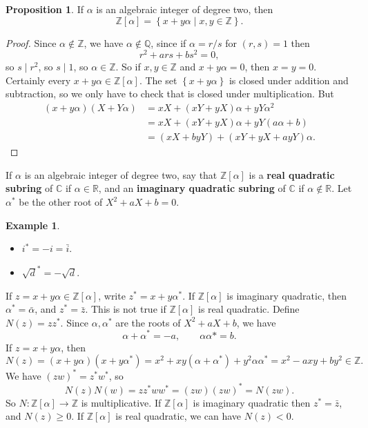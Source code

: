 \documentclass{article}
\newcommand{\Z}{\mathbb{Z}}
\newcommand{\Q}{\mathbb{Q}}
\newcommand{\R}{\mathbb{R}}
\newcommand{\C}{\mathbb{C}}
\newcommand{\rb}[1]{\left( #1 \right)}
\renewcommand{\sb}[1]{\left[ #1 \right]}
\newcommand{\cb}[1]{\left\{ #1 \right\}}
\theoremstyle{definition}\newtheorem{definition}{Definition}
\theoremstyle{definition}\newtheorem{remark}[definition]{Remark}
\theoremstyle{definition}\newtheorem*{example}{Example}
\theoremstyle{definition}\newtheorem*{note}{Note}
\newtheorem{proposition}[definition]{Proposition}
\begin{document}
\begin{proposition}
If $ \alpha $ is an algebraic integer of degree two, then
$$ \Z\sb{\alpha} = \cb{x + y\alpha \mid x, y \in \Z}. $$
\end{proposition}

\begin{proof}
Since $ \alpha \notin \Z $, we have $ \alpha \notin \Q $, since if $ \alpha = r / s $ for $ \rb{r, s} = 1 $ then
$$ r^2 + ars + bs^2 = 0, $$
so $ s \mid r^2 $, so $ s \mid 1 $, so $ \alpha \in \Z $. So if $ x, y \in \Z $ and $ x + y\alpha = 0 $, then $ x = y = 0 $. Certainly every $ x + y\alpha \in \Z\sb{\alpha} $. The set $ \cb{x + y\alpha} $ is closed under addition and subtraction, so we only have to check that is closed under multiplication. But
\begin{align*}
\rb{x + y\alpha}\rb{X + Y\alpha}
& = xX + \rb{xY + yX}\alpha + yY\alpha^2 \\
& = xX + \rb{xY + yX}\alpha + yY\rb{a\alpha + b} \\
& = \rb{xX + byY} + \rb{xY + yX + ayY}\alpha.
\end{align*}
\end{proof}

If $ \alpha $ is an algebraic integer of degree two, say that $ \Z\sb{\alpha} $ is a \textbf{real quadratic subring} of $ \C $ if $ \alpha \in \R $, and an \textbf{imaginary quadratic subring} of $ \C $ if $ \alpha \notin \R $. Let $ \alpha^* $ be the other root of $ X^2 + aX + b = 0 $.

\begin{example}
\hfill
\begin{itemize}
\item $ i^* = -i = \bar{i} $.
\item $ \sqrt{d}^* = -\sqrt{d} $.
\end{itemize}
\end{example}

If $ z = x + y\alpha \in \Z\sb{\alpha} $, write $ z^* = x + y\alpha^* $. If $ \Z\sb{\alpha} $ is imaginary quadratic, then $ \alpha^* = \bar{\alpha} $, and $ z^* = \bar{z} $. This is not true if $ \Z\sb{\alpha} $ is real quadratic. Define $ N\rb{z} = zz^* $. Since $ \alpha, \alpha^* $ are the roots of $ X^2 + aX + b $, we have
$$ \alpha + \alpha^* = -a, \qquad \alpha\alpha* = b. $$
If $ z = x + y\alpha $, then
$$ N\rb{z} = \rb{x + y\alpha}\rb{x + y\alpha^*} = x^2 + xy\rb{\alpha + \alpha^*} + y^2\alpha\alpha^* = x^2 - axy + by^2 \in \Z. $$
We have $ \rb{zw}^* = z^*w^* $, so
$$ N\rb{z}N\rb{w} = zz^*ww^* = \rb{zw}\rb{zw}^* = N\rb{zw}. $$
So $ N : \Z\sb{\alpha} \to \Z $ is multiplicative. If $ \Z\sb{\alpha} $ is imaginary quadratic then $ z^* = \bar{z} $, and $ N\rb{z} \ge 0 $. If $ \Z\sb{\alpha} $ is real quadratic, we can have $ N\rb{z} < 0 $.
\end{document}
